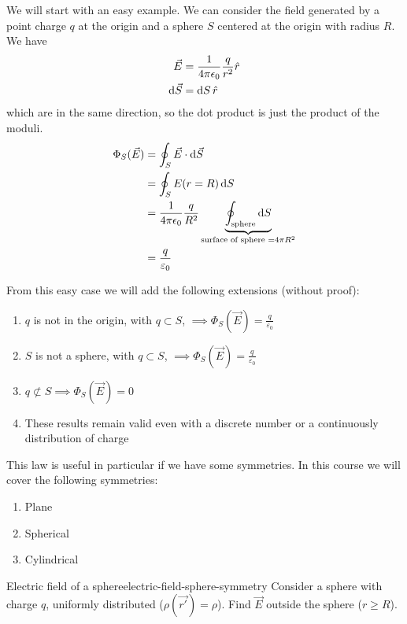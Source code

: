 \documentclass[12pt]{extarticle}
\begin{document}
We will start with an easy example.
We can consider the field generated by a point charge $q$ at the origin and a sphere $S$ centered at the origin with radius $R$.
We have
\begin{align}
	\vec E      & = \frac{1}{4 \pi \epsilon_0} \frac{q}{r^2} \hat r \\
	\dd{\vec S} & = \dd{S} \hat r
\end{align}
which are in the same direction, so the dot product is just the product of the moduli.
\begin{align}
	\Phi_S(\vec E) & = \oint_S \vec E \cdot \dd{\vec S}                                                                                         \\
	               & = \oint_S E(r = R) \dd{S}                                                                                                  \\
	               & = \frac{1}{4 \pi \epsilon_0} \frac{q}{R^2} \underbrace{\oint_\text{sphere} \dd{S}}_{\text{surface of sphere } = 4 \pi R^2} \\
	               & = \frac{q}{\varepsilon_0}
\end{align}

From this easy case we will add the following extensions (without proof):
\begin{enumerate}[label=\roman*.]
	\item $q$ is not in the origin, with $q \subset S$, $\implies \Phi_S(\vec E)=\frac{q}{\varepsilon_0}$
	\item $S$ is not a sphere, with $q \subset S$, $\implies \Phi_S(\vec E)=\frac{q}{\varepsilon_0}$
	\item $q \not \subset S \implies \Phi_S(\vec E)= 0$
	\item These results remain valid even with a discrete number or a continuously distribution of charge
\end{enumerate}

This law is useful in particular if we have some symmetries.
In this course we will cover the following symmetries:
\begin{enumerate}
	\item Plane
	\item Spherical
	\item Cylindrical
\end{enumerate}

\begin{example}{Electric field of a sphere}{electric-field-sphere-symmetry}
	Consider a sphere with charge $q$, uniformly distributed ($\rho(\vec{r'}) = \rho$).
	Find $\vec E$ outside the sphere ($r \geq R$).
\end{example}
\end{document}
